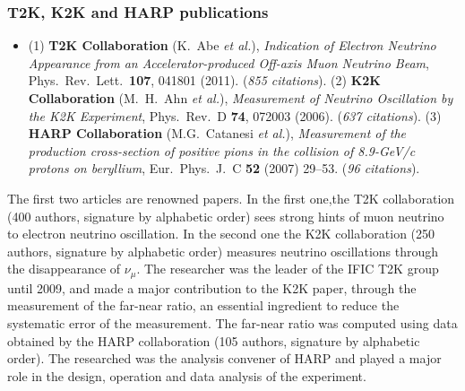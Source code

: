 
\subsubsection*{T2K, K2K and HARP publications}
\begin{itemize}
\item (1) {\bf T2K Collaboration} (K.~Abe {\it et al.}), {\it Indication of Electron Neutrino Appearance from an Accelerator-produced Off-axis Muon Neutrino Beam}, Phys.\ Rev.\ Lett.\  {\bf 107}, 041801 (2011). ({\it 855 citations}). (2) {\bf K2K Collaboration} (M.~H.~Ahn {\it et al.}), {\it Measurement of Neutrino Oscillation by the K2K Experiment}, Phys.\ Rev.\ D {\bf 74}, 072003 (2006). ({\it 637 citations}). (3) {\bf HARP Collaboration} (M.G.~Catanesi \textit{et al.}), \textit{Measurement of the production cross-section of positive pions in the collision of 8.9-GeV/c protons on beryllium}, Eur.\ Phys.\ J.\ C {\bf52} (2007) 29--53. ({\it 96 citations}).
\end{itemize}
The first two articles are renowned papers. In the first one,the T2K collaboration (400 authors, signature by alphabetic order) sees strong hints of muon neutrino to electron neutrino oscillation. In the second one the K2K collaboration (250 authors, signature by alphabetic order) measures neutrino oscillations  through the disappearance of $\nu_\mu$. The researcher was the leader of the IFIC T2K group until 2009, and made a major contribution to the K2K paper, through the measurement of the far-near ratio, an essential ingredient to reduce the systematic error of the measurement. The far-near ratio was computed using data obtained by the HARP collaboration (105 authors, signature by alphabetic order). The researched was the analysis convener of HARP and played a major role in the design, operation and data analysis of the experiment.
 	
